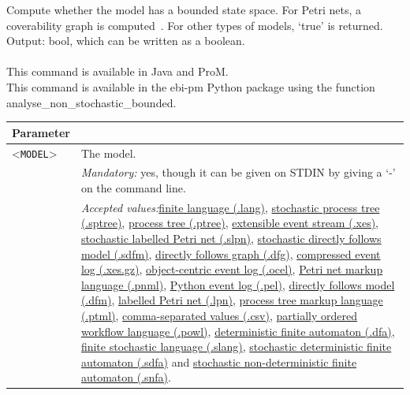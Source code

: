 {Compute whether the model has a bounded state space. 
        For Petri nets, a coverability graph is computed~\cite{esparza2019petri}. 
        For other types of models, `true' is returned.\\
\noindent Output: bool, which can be written as a boolean.\\
\\This command is available in Java and ProM.
\\This command is available in the ebi-pm Python package using the function analyse\_non\_stochastic\_bounded.
\begin{tabularx}{\linewidth}{lX}
\toprule
Parameter \\\midrule
<\texttt{MODEL}>&The model.\\
&\textit{Mandatory:} \quad yes, though it can be given on STDIN by giving a `-' on the command line.\\
&\textit{Accepted values:}\quad \hyperref[filehandler:finite language]{finite language (.lang)}, \hyperref[filehandler:stochastic process tree]{stochastic process tree (.sptree)}, \hyperref[filehandler:process tree]{process tree (.ptree)}, \hyperref[filehandler:extensible event stream]{extensible event stream (.xes)}, \hyperref[filehandler:stochastic labelled Petri net]{stochastic labelled Petri net (.slpn)}, \hyperref[filehandler:stochastic directly follows model]{stochastic directly follows model (.sdfm)}, \hyperref[filehandler:directly follows graph]{directly follows graph (.dfg)}, \hyperref[filehandler:compressed event log]{compressed event log (.xes.gz)}, \hyperref[filehandler:object-centric event log]{object-centric event log (.ocel)}, \hyperref[filehandler:Petri net markup language]{Petri net markup language (.pnml)}, \hyperref[filehandler:Python event log]{Python event log (.pel)}, \hyperref[filehandler:directly follows model]{directly follows model (.dfm)}, \hyperref[filehandler:labelled Petri net]{labelled Petri net (.lpn)}, \hyperref[filehandler:process tree markup language]{process tree markup language (.ptml)}, \hyperref[filehandler:comma-separated values]{comma-separated values (.csv)}, \hyperref[filehandler:partially ordered workflow language]{partially ordered workflow language (.powl)}, \hyperref[filehandler:deterministic finite automaton]{deterministic finite automaton (.dfa)}, \hyperref[filehandler:finite stochastic language]{finite stochastic language (.slang)}, \hyperref[filehandler:stochastic deterministic finite automaton]{stochastic deterministic finite automaton (.sdfa)} and \hyperref[filehandler:stochastic non-deterministic finite automaton]{stochastic non-deterministic finite automaton (.snfa)}.\\

\end{tabularx}}

